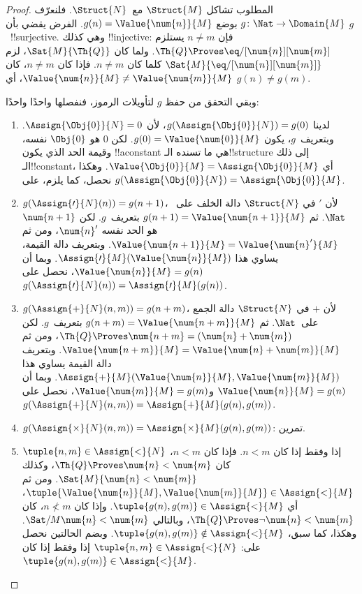 \documentclass[../../../include/open-logic-section]{subfiles}
\begin{document}
\begin{proof}
المطلوب تشاكل $\Struct{M}$ مع~$\Struct{N}$. فلنعرّف
$g\colon \Nat \to \Domain{M}$ بوضع
$g(n)=\Value{\num{n}}{M}$. الفرض يقضي بأن $g$~!!{surjective}.
وهي كذلك !!{injective}: فإن $n \neq m$ يستلزم
$\Th{Q} \Proves \eq/[\num{n}][\num{m}]$. ولما كان
$\Sat{M}{\Th{Q}}$، لزم $\Sat{M}{\eq/[\num{n}][\num{m}]}$
كلما كان $n \neq m$. فإذا كان $n \neq m$، كان
$\Value{\num{n}}{M} \neq \Value{\num{m}}{M}$، أي $g(n) \neq g(m)$.

وبقي التحقق من حفظ $g$ لتأويلات الرموز، فنفصلها واحدًا واحدًا:
\begin{enumerate}
\item لدينا $g(\Assign{\Obj{0}}{N})=g(0)$، لأن
  $\Assign{\Obj{0}}{N}=0$. وبتعريف~$g$، يكون
  $g(0)=\Value{\num{0}}{M}$. لكن $\num{0}$ هو $\Obj{0}$ نفسه، وقيمة
  الحد الذي يكون !!a{constant} هي ما تسنده الـ!!{structure} إلى ذلك
  الـ!!{constant}، أي
  $\Value{\Obj{0}}{M}=\Assign{\Obj{0}}{M}$. وهكذا نحصل، كما يلزم، على
  $g(\Assign{\Obj{0}}{N})=\Assign{\Obj{0}}{M}$.
\item $g(\Assign{\prime}{N}(n))=g(n+1)$، لأن $\prime$ في
  $\Struct{N}$ دالة الخلف على~$\Nat$. ثم
  $g(n+1)=\Value{\num{n+1}}{M}$ بتعريف~$g$. لكن $\num{n+1}$ هو الحد
  نفسه $\num{n}'$، ومن ثم
  $\Value{\num{n+1}}{M}=\Value{\num{n}'}{M}$. وبتعريف دالة القيمة،
  يساوي هذا $\Assign{\prime}{M}(\Value{\num{n}}{M})$. وبما أن
  $\Value{\num{n}}{M}=g(n)$، نحصل على
  $g(\Assign{\prime}{N}(n))=\Assign{\prime}{M}(g(n))$.
\item $g(\Assign{+}{N}(n,m))=g(n+m)$، لأن $+$ في $\Struct{N}$ دالة
  الجمع على~$\Nat$. ثم $g(n+m)=\Value{\num{n+m}}{M}$ بتعريف~$g$.
  لكن $\Th{Q} \Proves \num{n+m} = (\num{n} + \num{m})$، ومن ثم
  $\Value{\num{n+m}}{M}=\Value{\num{n}+\num{m}}{M}$. وبتعريف دالة
  القيمة يساوي هذا
  $\Assign{+}{M}(\Value{\num{n}}{M},\Value{\num{m}}{M})$. وبما أن
  $\Value{\num{n}}{M}=g(n)$ و$\Value{\num{m}}{M}=g(m)$، نحصل على
  $g(\Assign{+}{N}(n,m))=\Assign{+}{M}(g(n),g(m))$.
\item $g(\Assign{\times}{N}(n, m)) = \Assign{\times}{M}(g(n), g(m))$:
  تمرين.
\item $\tuple{n,m} \in \Assign{<}{N}$ إذا وفقط إذا كان $n<m$. فإذا
  كان $n<m$، كان $\Th{Q} \Proves \num{n} < \num{m}$، وكذلك
  $\Sat{M}{\num{n} < \num{m}}$. ومن ثم
  $\tuple{\Value{\num{n}}{M},\Value{\num{m}}{M}} \in \Assign{<}{M}$،
  أي $\tuple{g(n),g(m)} \in \Assign{<}{M}$. وإذا كان $n \not< m$، كان
  $\Th{Q} \Proves \lnot \num{n} < \num{m}$، وبالتالي
  $\Sat/{M}{\num{n} < \num{m}}$. وهكذا، كما سبق،
  $\tuple{g(n),g(m)} \notin \Assign{<}{M}$. وبضم الحالتين نحصل على:
  $\tuple{n,m} \in \Assign{<}{N}$ إذا وفقط إذا كان
  $\tuple{g(n),g(m)} \in \Assign{<}{M}$.
\end{enumerate}
\end{proof}
\end{document}
